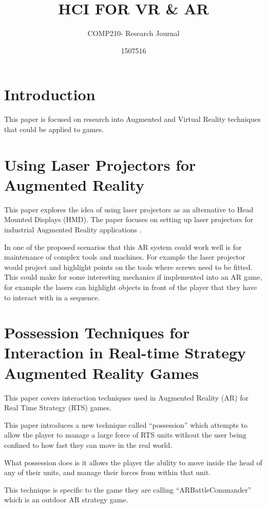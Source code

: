 \documentclass{scrartcl}
\title{HCI FOR VR \& AR}
\subtitle{COMP210- Research Journal}
\author{1507516}
\begin{document}
\maketitle

\abstract{}


\section{Introduction}
This paper is focused on research into Augmented and Virtual Reality techniques that could be applied to games.

\section {Using Laser Projectors for Augmented Reality\cite{Schwerdtfeger:2008}}

This paper explores the idea of using laser projectors as an alternative to Head Mounted Displays (HMD).
The paper focuses on setting up laser projectors for industrial Augmented Reality applications \cite{Schwerdtfeger:2008}.

In one of the proposed scenarios that this AR system could work well is for maintenance of complex tools and machines. For example the laser projector would project and highlight points on the tools where screws need to be fitted. This could make for some interesting mechanics if implemented into an AR game, for example the lasers can highlight objects in front of the player that they have to interact with in a sequence.

\section {Possession Techniques for Interaction in Real-time Strategy Augmented Reality Games \cite{Phillips:2005}}
This paper covers interaction techniques used in Augmented Reality (AR) for Real Time Strategy (RTS) games.

This paper introduces a new technique called ``possession'' which attempts to allow the player to manage a large force of RTS units without the user being confined to how fast they can move in the real world.

What possession does is it allows the player the ability to move inside the head of any of their units,  and manage their forces from within that unit. 

This technique is specific to the game they are calling ``ARBattleCommander'' which is an outdoor AR strategy game.
\end{document}

